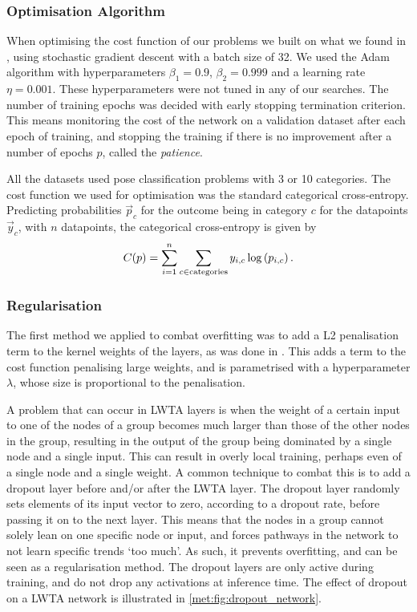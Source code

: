     \subsubsection{Optimisation Algorithm}
        When optimising the cost function of our problems we built on what we found in \citep{Project2}, using stochastic gradient descent with a batch size of 32. We used the Adam algorithm with hyperparameters $\beta_1 = 0.9$, $\beta_2 = 0.999$ and a learning rate $\eta = 0.001$. These hyperparameters were not tuned in any of our searches. The number of training epochs was decided with early stopping termination criterion. This means monitoring the cost of the network on a validation dataset after each epoch of training, and stopping the training if there is no improvement after a number of epochs $p$, called the \textit{patience}.

        All the datasets used pose classification problems with 3 or 10 categories. The cost function we used for optimisation was the standard categorical cross-entropy. Predicting probabilities $\vec{p}_c$ for the outcome being in category $c$ for the datapoints $\vec{y}_c$, with $n$ datapoints, the categorical cross-entropy is given by
        \begin{align}
            C(p) = \sum_{i=1}^n \sum_{c \in \mathrm{categories}} y_{i,c} \log\left(p_{i,c}\right).
        \end{align}

    \subsubsection{Regularisation}
        The first method we applied to combat overfitting was to add a L2 penalisation term to the kernel weights of the layers, as was done in \cite{Project2}. This adds a term to the cost function penalising large weights, and is parametrised with a hyperparameter $\lambda$, whose size is proportional to the penalisation.

        A problem that can occur in LWTA layers is when the weight of a certain input to one of the nodes of a group becomes much larger than those of the other nodes in the group, resulting in the output of the group being dominated by a single node and a single input. This can result in overly local training, perhaps even of a single node and a single weight. A common technique to combat this is to add a dropout layer before and/or after the LWTA layer. The dropout layer randomly sets elements of its input vector to zero, according to a dropout rate, before passing it on to the next layer. This means that the nodes in a group cannot solely lean on one specific node or input, and forces pathways in the network to not learn specific trends `too much'. As such, it prevents overfitting, and can be seen as a regularisation method. The dropout layers are only active during training, and do not drop any activations at inference time. The effect of dropout on a LWTA network is illustrated in \cref{met:fig:dropout_network}.

